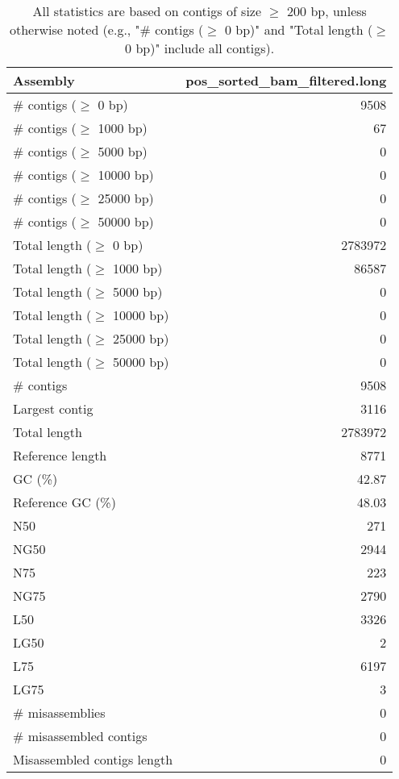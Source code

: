 \documentclass[12pt,a4paper]{article}
\begin{document}
\begin{table}[ht]
\begin{center}
\caption{All statistics are based on contigs of size $\geq$ 200 bp, unless otherwise noted (e.g., "\# contigs ($\geq$ 0 bp)" and "Total length ($\geq$ 0 bp)" include all contigs).}
\begin{tabular}{|l*{1}{|r}|}
\hline
Assembly & pos\_sorted\_bam\_filtered.long \\ \hline
\# contigs ($\geq$ 0 bp) & 9508 \\ \hline
\# contigs ($\geq$ 1000 bp) & 67 \\ \hline
\# contigs ($\geq$ 5000 bp) & 0 \\ \hline
\# contigs ($\geq$ 10000 bp) & 0 \\ \hline
\# contigs ($\geq$ 25000 bp) & 0 \\ \hline
\# contigs ($\geq$ 50000 bp) & 0 \\ \hline
Total length ($\geq$ 0 bp) & 2783972 \\ \hline
Total length ($\geq$ 1000 bp) & 86587 \\ \hline
Total length ($\geq$ 5000 bp) & 0 \\ \hline
Total length ($\geq$ 10000 bp) & 0 \\ \hline
Total length ($\geq$ 25000 bp) & 0 \\ \hline
Total length ($\geq$ 50000 bp) & 0 \\ \hline
\# contigs & 9508 \\ \hline
Largest contig & 3116 \\ \hline
Total length & 2783972 \\ \hline
Reference length & 8771 \\ \hline
GC (\%) & 42.87 \\ \hline
Reference GC (\%) & 48.03 \\ \hline
N50 & 271 \\ \hline
NG50 & 2944 \\ \hline
N75 & 223 \\ \hline
NG75 & 2790 \\ \hline
L50 & 3326 \\ \hline
LG50 & 2 \\ \hline
L75 & 6197 \\ \hline
LG75 & 3 \\ \hline
\# misassemblies & 0 \\ \hline
\# misassembled contigs & 0 \\ \hline
Misassembled contigs length & 0 \\ \hline

\end{tabular}
\end{center}
\end{table}
\end{document}
